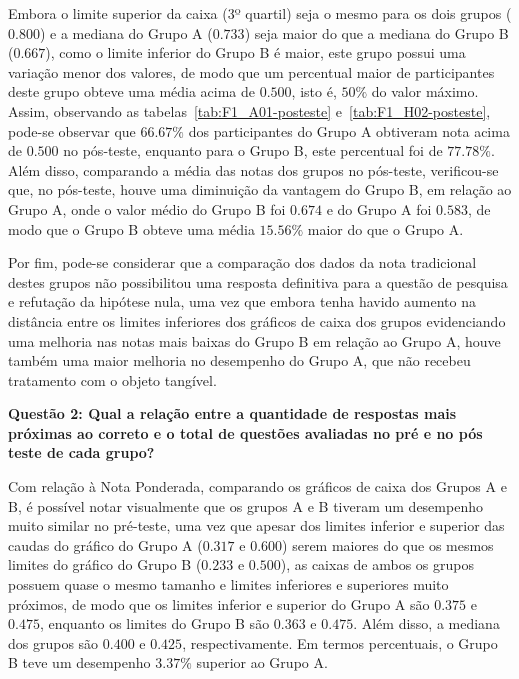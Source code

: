 Embora o limite superior da caixa (3º quartil) seja o mesmo para os dois grupos ($0.800$) e a mediana do Grupo A ($0.733$) seja maior do que a mediana do Grupo B ($0.667$), como o limite inferior do Grupo B é maior, este grupo possui uma variação menor dos valores, de modo que um percentual maior de participantes deste grupo obteve uma média acima de $0.500$, isto é, $50\%$ do valor máximo. Assim, observando as tabelas~\ref{tab:F1_A01-posteste} e~\ref{tab:F1_H02-posteste}, pode-se observar que $66.67\%$ dos participantes do Grupo A obtiveram nota acima de $0.500$ no pós-teste, enquanto para o Grupo B, este percentual foi de $77.78\%$. Além disso, comparando a média das notas dos grupos no pós-teste, verificou-se que, no pós-teste, houve uma diminuição da vantagem do Grupo B, em relação ao Grupo A, onde o valor médio do Grupo B foi $0.674$ e do Grupo A foi $0.583$, de modo que o Grupo B obteve uma média $15.56\%$ maior do que o Grupo A.

Por fim, pode-se considerar que a comparação dos dados da nota tradicional destes grupos não possibilitou uma resposta definitiva para a questão de pesquisa e refutação da hipótese nula, uma vez que embora tenha havido aumento na distância entre os limites inferiores dos gráficos de caixa dos grupos evidenciando uma melhoria nas notas mais baixas do Grupo B em relação ao Grupo A, houve também uma maior melhoria no desempenho do Grupo A, que não recebeu tratamento com o objeto tangível.


\textbf{Questão 2: Qual a relação entre a quantidade de respostas mais próximas ao correto e o total de questões avaliadas no pré e no pós teste de cada grupo?}

Com relação à Nota Ponderada, comparando os gráficos de caixa dos Grupos A e B, é possível notar visualmente que os grupos A e B tiveram um desempenho muito similar no pré-teste, uma vez que apesar dos limites inferior e superior das caudas do gráfico do Grupo A ($0.317$ e $0.600$) serem maiores do que os mesmos limites do gráfico do Grupo B ($0.233$ e $0.500$), as caixas de ambos os grupos possuem quase o mesmo tamanho e limites inferiores e superiores muito próximos, de modo que os limites inferior e superior do Grupo A são $0.375$ e $0.475$, enquanto os limites do Grupo B são $0.363$ e $0.475$. Além disso, a mediana dos grupos são $0.400$ e $0.425$, respectivamente. Em termos percentuais, o Grupo B teve um desempenho $3.37\%$ superior ao Grupo A.

